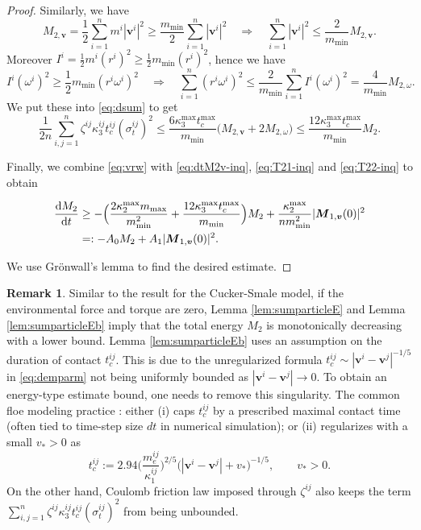\documentclass[a4paper,11pt]{article}
\numberwithin{equation}{section}
\theoremstyle{definition}
\newtheorem{remark}[theorem]{Remark}
\newcommand{\bfv}{\boldsymbol{v}}
\newcommand{\bfM}{\boldsymbol{M}}
\def\d{{  \rm d}}
\begin{document}
\begin{proof}
Similarly, we have
\[
M_{2,\bfv}=\frac12\sum_{i=1}^n m^i|\bfv^i|^2 \ge \frac{m_{\min}}{2}\sum_{i=1}^n|\bfv^i|^2
\quad\Rightarrow\quad
\sum_{i=1}^n|\bfv^i|^2 \le \frac{2}{m_{\min}} M_{2,\bfv}.
\]
Moreover $I^i=\frac{1}{2}m^i(r^i)^2\ge \frac{1}{2}m_{\min}(r^i)^2$, hence we have
\[
I^i(\omega^i)^2 \ge \frac{1}{2}m_{\min}(r^i\omega^i)^2
\quad\Longrightarrow\quad
\sum_{i=1}^n(r^i\omega^i)^2
\le
\frac{2}{m_{\min}}\sum_{i=1}^n I^i(\omega^i)^2
=
\frac{4}{m_{\min}} M_{2,\omega}.
\]
We put these into \eqref{eq:dsum} to get
\[
\frac{1}{2n}\sum_{i,j=1}^n  \zeta^{ij} \kappa^{ij}_3  t_c^{ij} (\sigma^{ij}_t)^2
\le
\frac{6\kappa_3^{\max} t_c^{\max}}{m_{\min}} \Big(M_{2,\bfv}+2M_{2,\omega}\Big) \le \frac{12\kappa_3^{\max} t_c^{\max}}{m_{\min}} M_2.
\]

Finally, we combine \eqref{eq:vrw} with \eqref{eq:dtM2v-inq}, \eqref{eq:T21-inq} and \eqref{eq:T22-inq} to obtain

\begin{align*}
\begin{aligned}
\frac{\d M_2}{\d t} &\geq  -
\Big( \frac{2\kappa^{\max}_2 m_{\max}}{ m^2_{\min}} + \frac{12\kappa_3^{\max} t_c^{\max}}{m_{\min}} \Big) M_{2}
+ \frac{\kappa^{\max}_2}{n m^2_{\min}} | \bfM_{1,\bfv}(0)|^2  \\
&=: - A_0 M_{2} + A_1 | \bfM_{1,\bfv}(0)|^2.
\end{aligned}
\end{align*}

\noindent
We use Grönwall's lemma \cite{gronwall1919note,evans2022partial} to find the desired estimate. 
\end{proof}



\begin{remark}
    Similar to the result \cite{ha2008Kinetic} for the Cucker-Smale model, if the environmental force and torque are zero, Lemma \ref{lem:sumparticleE} and Lemma \ref{lem:sumparticleEb} imply that the total energy $M_2$ is monotonically decreasing with a lower bound. 
    Lemma \ref{lem:sumparticleEb} uses an assumption on the duration of contact $t_c^{ij}$. 
    This is due to the unregularized formula $t_c^{ij}\sim |\bfv^i-\bfv^j|^{-1/5}$ in \eqref{eq:demparm} not being uniformly bounded as $|\bfv^i-\bfv^j|\to 0$. To obtain an energy-type estimate bound, one needs to remove this singularity. The common floe modeling practice \cite{herman2016discrete,damsgaard2018application}: either (i) caps $t_c^{ij}$ by a prescribed maximal contact time (often tied to time-step size $dt$ in numerical simulation); or (ii) regularizes with a small $v_\ast>0$ as 
\[
t_c^{ij}
:= 2.94\Big(\frac{m_e^{ij}}{\kappa_1^{ij}}\Big)^{2/5}
\Big(|\bfv^i-\bfv^j|+v_\ast\Big)^{-1/5},
\qquad v_\ast>0.
\]
On the other hand, Coulomb friction law imposed through $\zeta^{ij}$ also keeps the term $\sum_{i,j=1}^n  \zeta^{ij} \kappa^{ij}_3  t_c^{ij} (\sigma^{ij}_t)^2$ from being unbounded.  
\end{remark}
\end{document}
